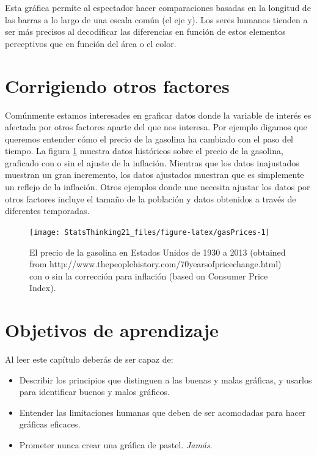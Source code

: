 \documentclass[
  12pt,
]{book}
\providecommand{\tightlist}{%
  \setlength{\itemsep}{0pt}\setlength{\parskip}{0pt}}
\theoremstyle{definition}
\theoremstyle{definition}
\theoremstyle{definition}
\theoremstyle{remark}
\begin{document}
Esta gráfica permite al espectador hacer comparaciones basadas en la longitud de las barras a lo largo de una escala común (el eje y). Los seres humanos tienden a ser más precisos al decodificar las diferencias en función de estos elementos perceptivos que en función del área o el color.

\hypertarget{corrigiendo-otros-factores}{%
\section{Corrigiendo otros factores}\label{corrigiendo-otros-factores}}

Comúnmente estamos interesades en graficar datos donde la variable de interés es afectada por otros factores aparte del que nos interesa. Por ejemplo digamos que queremos entender cómo el precio de la gasolina ha cambiado con el paso del tiempo. La figura \ref{fig:gasPrices} muestra datos históricos sobre el precio de la gasolina, graficado con o sin el ajuste de la inflación. Mientras que los datos inajustados muestran un gran incremento, los datos ajustados muestran que es simplemente un reflejo de la inflación. Otros ejemplos donde une necesita ajustar los datos por otros factores incluye el tamaño de la población y datos obtenidos a través de diferentes temporadas.

\begin{figure}
\texttt{[image: StatsThinking21\_files/figure-latex/gasPrices-1]} \caption{El precio de la gasolina en Estados Unidos de 1930 a 2013 (obtained from http://www.thepeoplehistory.com/70yearsofpricechange.html) con o sin la corrección para inflación (based on Consumer Price Index).}\label{fig:gasPrices}
\end{figure}

\hypertarget{objetivos-de-aprendizaje}{%
\section{Objetivos de aprendizaje}\label{objetivos-de-aprendizaje}}

Al leer este capítulo deberás de ser capaz de:

\begin{itemize}
\tightlist
\item
  Describir los principios que distinguen a las buenas y malas gráficas, y usarlos para identificar buenos y malos gráficos.
\item
  Entender las limitaciones humanas que deben de ser acomodadas para hacer gráficas eficaces.
\item
  Prometer nunca crear una gráfica de pastel. \emph{Jamás}.
\end{itemize}
\end{document}

